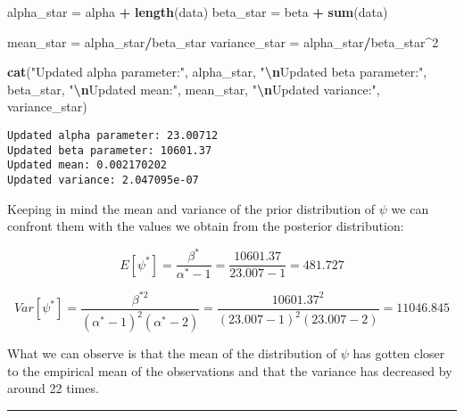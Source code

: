 \documentclass[
]{article}
\newenvironment{Shaded}{\begin{snugshade}}{\end{snugshade}}
\newcommand{\DecValTok}[1]{\textcolor[rgb]{0.00,0.00,0.81}{#1}}
\newcommand{\FunctionTok}[1]{\textcolor[rgb]{0.13,0.29,0.53}{\textbf{#1}}}
\newcommand{\NormalTok}[1]{#1}
\newcommand{\OtherTok}[1]{\textcolor[rgb]{0.56,0.35,0.01}{#1}}
\newcommand{\SpecialCharTok}[1]{\textcolor[rgb]{0.81,0.36,0.00}{\textbf{#1}}}
\newcommand{\StringTok}[1]{\textcolor[rgb]{0.31,0.60,0.02}{#1}}
\begin{document}
\begin{Shaded}
\begin{Highlighting}[]
\NormalTok{alpha\_star }\OtherTok{=}\NormalTok{ alpha }\SpecialCharTok{+} \FunctionTok{length}\NormalTok{(data)}
\NormalTok{beta\_star }\OtherTok{=}\NormalTok{ beta }\SpecialCharTok{+} \FunctionTok{sum}\NormalTok{(data)}

\NormalTok{mean\_star }\OtherTok{=}\NormalTok{ alpha\_star}\SpecialCharTok{/}\NormalTok{beta\_star}
\NormalTok{variance\_star }\OtherTok{=}\NormalTok{ alpha\_star}\SpecialCharTok{/}\NormalTok{beta\_star}\SpecialCharTok{\^{}}\DecValTok{2}

\FunctionTok{cat}\NormalTok{(}\StringTok{"Updated alpha parameter:"}\NormalTok{, alpha\_star, }\StringTok{"}\SpecialCharTok{\textbackslash{}n}\StringTok{Updated beta parameter:"}\NormalTok{,}
\NormalTok{    beta\_star, }\StringTok{"}\SpecialCharTok{\textbackslash{}n}\StringTok{Updated mean:"}\NormalTok{, mean\_star, }\StringTok{"}\SpecialCharTok{\textbackslash{}n}\StringTok{Updated variance:"}\NormalTok{,}
\NormalTok{    variance\_star)}
\end{Highlighting}
\end{Shaded}

\begin{verbatim}
Updated alpha parameter: 23.00712 
Updated beta parameter: 10601.37 
Updated mean: 0.002170202 
Updated variance: 2.047095e-07
\end{verbatim}

Keeping in mind the mean and variance of the prior distribution of
\(\psi\) we can confront them with the values we obtain from the
posterior distribution:

\[
E[\psi^*] = \frac{\beta^*}{\alpha^* - 1} = \frac{10601.37}{23.007 - 1} = 481.727
\]

\[
Var[\psi^*] = \frac{\beta^{*2}}{(\alpha^* - 1)^2(\alpha^* - 2)} = \frac{10601.37^2}{(23.007 - 1)^2(23.007 - 2)} = 11046.845
\]

What we can observe is that the mean of the distribution of \(\psi\) has
gotten closer to the empirical mean of the observations and that the
variance has decreased by around 22 times.

\begin{center}\rule{0.5\linewidth}{0.5pt}\end{center}
\end{document}
